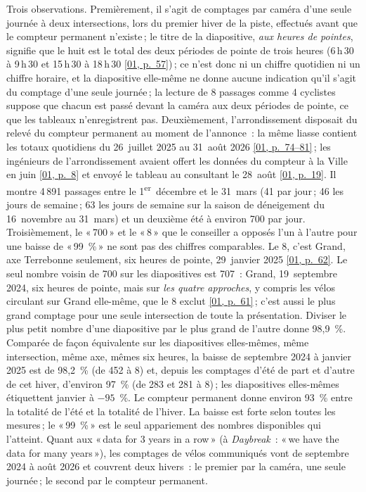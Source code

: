 \documentclass[11pt,letterpaper]{article}
\newcommand{\pagesurl}{https://openmobilitydata.github.io/Terrebonne-access-requests}
\newcommand{\pgl}[3]{\href{\pagesurl/\csname bundle#1\endcsname\#page=#2}{\textsf{\small[#1, p.~#3]}}}
\newcommand{\pg}[2]{\pgl{#1}{#2}{#2}}
\begin{document}
Trois observations. Premièrement, il s'agit de comptages par caméra d'une
seule journée à deux intersections, lors du premier hiver de la piste,
effectués avant que le compteur permanent n'existe\,; le titre de la
diapositive, \emph{aux heures de pointes}, signifie que le huit est le
total des deux périodes de pointe de trois heures (6\,h\,30 à 9\,h\,30 et
15\,h\,30 à 18\,h\,30 \pg{01}{57})\,; ce n'est donc ni un chiffre
quotidien ni un chiffre horaire, et la diapositive elle-même ne donne
aucune indication qu'il s'agit du comptage d'une seule journée\,; la
lecture de 8 passages comme 4 cyclistes suppose que chacun est passé
devant la caméra aux deux périodes de pointe, ce que les tableaux
n'enregistrent pas. Deuxièmement, l'arrondissement disposait du relevé du
compteur permanent au moment de l'annonce~: la même liasse contient les totaux quotidiens du
26~juillet 2025 au 31~août 2026 \pgl{01}{74}{74--81}\,; les ingénieurs de
l'arrondissement avaient offert les données du compteur à la Ville en juin
\pg{01}{8} et envoyé le tableau au consultant le 28~août \pg{01}{19}. Il
montre 4\,891 passages entre le 1\textsuperscript{er}~décembre et le 31~mars
(41 par jour\,; 46 les jours de semaine\,; 63 les jours de semaine sur la
saison de déneigement du 16~novembre au 31~mars) et un deuxième été à
environ 700 par jour. Troisièmement, le «\,700\,» et le «\,8\,» que le
conseiller a opposés l'un à l'autre pour une baisse de «\,99~\%\,» ne sont pas
des chiffres comparables. Le 8, c'est Grand, axe Terrebonne seulement, six
heures de pointe, 29~janvier 2025 \pg{01}{62}. Le seul nombre voisin de 700
sur les diapositives est 707~: Grand, 19~septembre 2024, six heures de
pointe, mais sur \emph{les quatre approches}, y compris les vélos
circulant sur Grand elle-même, que le 8 exclut \pg{01}{61}\,; c'est aussi le
plus grand comptage pour une seule intersection de toute la présentation.
Diviser le plus petit nombre d'une diapositive par le plus grand de l'autre
donne 98,9~\%. Comparée de façon équivalente sur les diapositives
elles-mêmes, même intersection, même axe, mêmes six heures, la baisse de
septembre 2024 à janvier 2025 est de 98,2~\% (de 452 à 8) et, depuis les
comptages d'été de part et d'autre de cet hiver, d'environ 97~\% (de 283 et
281 à 8)\,; les diapositives elles-mêmes étiquettent janvier à $-95$~\%. Le
compteur permanent donne environ 93~\% entre la totalité de l'été et la
totalité de l'hiver. La baisse est forte selon toutes les mesures\,; le
«\,99~\%\,» est le seul appariement des nombres disponibles qui l'atteint.
Quant aux «\,data for 3 years in a row\,» (à \emph{Daybreak}~: «\,we have
the data for many years\,»), les comptages de vélos
communiqués vont de septembre 2024 à août 2026 et couvrent deux hivers~: le
premier par la caméra, une seule journée\,; le second par le compteur
permanent.
\end{document}
